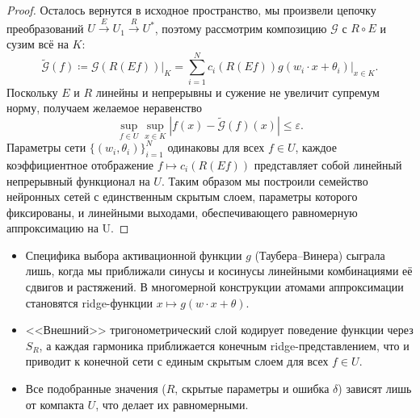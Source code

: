 \documentclass[../NDCNNAI_main.tex]{subfiles}
\begin{document}
\begin{proof}
  Осталось вернутся в исходное пространство, мы произвели цепочку преобразований $U \xrightarrow{E} U_1 \xrightarrow{R} U^*$, поэтому рассмотрим композицию $\mathcal{G}$ с $R \circ E$ и сузим всё на $K$:
  $$\widetilde{\mathcal{G}}(f) \coloneq \mathcal{G}\left(R(Ef)\right) \big|_K = \sum_{i=1}^{N} c_i\left(R(Ef)\right) g(w_i \cdot x + \theta_i)\Big|_{x \in K}.$$
  Поскольку $E$ и $R$ линейны и непрерывны и сужение не увеличит супремум норму, получаем желаемое неравенство
  $$\sup_{f \in U} \sup_{x \in K} |f(x) - \widetilde{\mathcal{G}}(f)(x)| \le \varepsilon.$$
  Параметры сети $\{(w_i, \theta_i)\}_{i=1}^{N}$ одинаковы для всех $f \in U$, каждое коэффициентное отображение $f \mapsto c_i\left(R(Ef)\right)$ представляет собой линейный непрерывный функционал на $U$.
  Таким образом мы построили семейство нейронных сетей с единственным скрытым слоем, параметры которого фиксированы, и линейными выходами, обеспечивающего равномерную аппроксимацию на U.
\end{proof}
\begin{remarks}
  \leavevmode
  \begin{itemize}
    \item Специфика выбора активационной функции $g$ (Таубера--Винера) сыграла лишь, когда мы приближали синусы и косинусы линейными комбинациями её сдвигов и растяжений.
    В многомерной конструкции атомами аппроксимации становятся ridge-функции $x \mapsto g(w \cdot x + \theta)$.
    \item <<Внешний>> тригонометрический слой кодирует поведение функции через $S_R$, а каждая гармоника приближается конечным ridge-представлением, что и приводит к конечной сети с единым скрытым слоем для всех $f \in U$.
    \item Все подобранные значения ($R$, скрытые параметры и ошибка $\delta$) зависят лишь от компакта $U$, что делает их равномерными.
  \end{itemize}
\end{remarks}
\end{document}
